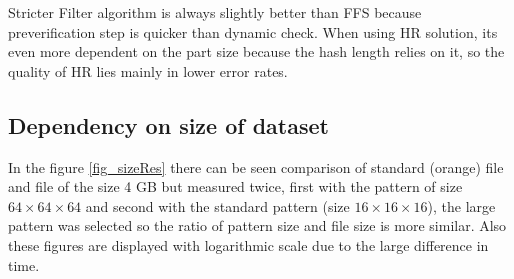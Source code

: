Stricter Filter algorithm is always slightly better than FFS because preverification step is quicker than dynamic check. When using HR solution, its even more dependent on the part size because the hash length relies on it, so the quality of HR lies mainly in lower error rates.


\subsection{Dependency on size of dataset}
In the figure \ref{fig_sizeRes} there can be seen comparison of standard (orange) file and file of the size 4 GB but measured twice, first with the pattern of size $64\times64\times64$ and second with the standard pattern (size $16\times16\times16$), the large pattern was selected so the ratio of pattern size and file size is more similar. Also these figures are displayed with logarithmic scale due to the large difference in time. 

